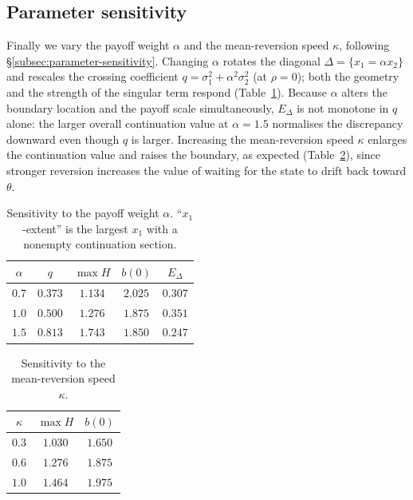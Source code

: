 \documentclass[pdflatex,sn-mathphys-num]{sn-jnl}
\theoremstyle{plain}
\theoremstyle{definition}
\theoremstyle{remark}
\numberwithin{equation}{section}
\begin{document}
\subsection{Parameter sensitivity}
\label{subsec:numerics-sensitivity}

Finally we vary the payoff weight $\alpha$ and the mean-reversion speed $\kappa$,
following \S\ref{subsec:parameter-sensitivity}. Changing $\alpha$ rotates the
diagonal $\Delta=\{x_1=\alpha x_2\}$ and rescales the crossing coefficient
$q=\sigma_1^2+\alpha^2\sigma_2^2$ (at $\rho=0$); both the geometry and the
strength of the singular term respond (Table~\ref{tab:alpha}). Because $\alpha$
alters the boundary location and the payoff scale simultaneously, $E_\Delta$ is
not monotone in $q$ alone: the larger overall continuation value at
$\alpha=1.5$ normalises the discrepancy downward even though $q$ is larger.
Increasing the mean-reversion speed $\kappa$ enlarges the continuation value and
raises the boundary, as expected (Table~\ref{tab:kappa}), since stronger
reversion increases the value of waiting for the state to drift back toward
$\theta$.

\begin{table}[t]
\centering
\caption{Sensitivity to the payoff weight $\alpha$. ``$x_1$-extent'' is the
largest $x_1$ with a nonempty continuation section.}
\label{tab:alpha}
\begin{tabular}{ccccc}
\toprule
$\alpha$ & $q$ & $\max H$ & $b(0)$ & $E_\Delta$ \\
\midrule
$0.7$ & $0.373$ & $1.134$ & $2.025$ & $0.307$ \\
$1.0$ & $0.500$ & $1.276$ & $1.875$ & $0.351$ \\
$1.5$ & $0.813$ & $1.743$ & $1.850$ & $0.247$ \\
\bottomrule
\end{tabular}
\end{table}

\begin{table}[t]
\centering
\caption{Sensitivity to the mean-reversion speed $\kappa$.}
\label{tab:kappa}
\begin{tabular}{ccc}
\toprule
$\kappa$ & $\max H$ & $b(0)$ \\
\midrule
$0.3$ & $1.030$ & $1.650$ \\
$0.6$ & $1.276$ & $1.875$ \\
$1.0$ & $1.464$ & $1.975$ \\
\bottomrule
\end{tabular}
\end{table}
\end{document}
